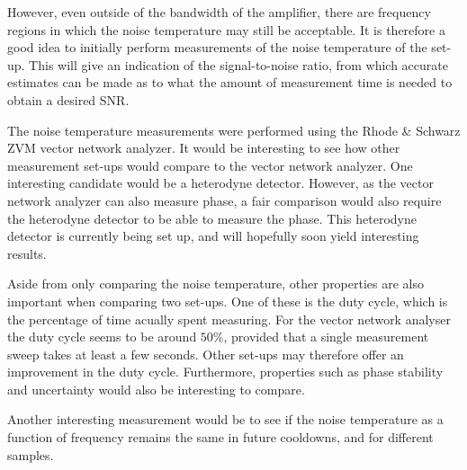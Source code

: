 \documentclass[12pt]{report}
\begin{document}
However, even outside of the bandwidth of the amplifier, there are frequency regions in which the noise temperature may still be acceptable. It is therefore a good idea to initially perform measurements of the noise temperature of the set-up. This will give an indication of the signal-to-noise ratio, from which accurate estimates can be made as to what the amount of measurement time is needed to obtain a desired SNR.

The noise temperature measurements were performed using the Rhode \& Schwarz ZVM vector network analyzer. It would be interesting to see how other measurement set-ups would compare to the vector network analyzer. One interesting candidate would be a heterodyne detector. However, as the vector network analyzer can also measure phase, a fair comparison would also require the heterodyne detector to be able to measure the phase. This heterodyne detector is currently being set up, and will hopefully soon yield interesting results.

Aside from only comparing the noise temperature, other properties are also important when comparing two set-ups. One of these is the duty cycle, which is the percentage of time acually spent measuring. For the vector network analyser the duty cycle seems to be around $50\%$, provided that a single measurement sweep takes at least a few seconds. Other set-ups may therefore offer an improvement in the duty cycle. Furthermore, properties such as phase stability and uncertainty would also be interesting to compare.

Another interesting measurement would be to see if the noise temperature as a function of frequency remains the same in future cooldowns, and for different samples.




\end{document}
